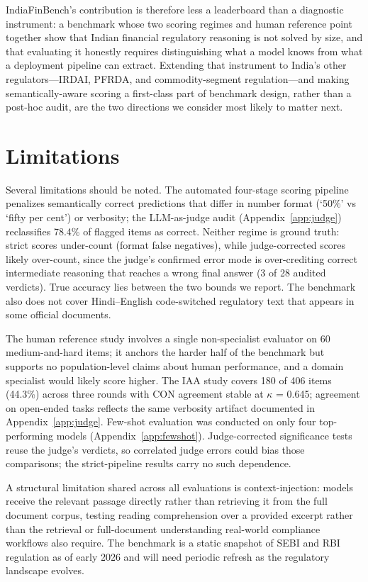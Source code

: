 \documentclass[11pt]{article}
\begin{document}
IndiaFinBench's contribution is therefore less a leaderboard than a diagnostic instrument: a benchmark whose two scoring regimes and human reference point together show that Indian financial regulatory reasoning is not solved by size, and that evaluating it honestly requires distinguishing what a model knows from what a deployment pipeline can extract. Extending that instrument to India's other regulators---IRDAI, PFRDA, and commodity-segment regulation---and making semantically-aware scoring a first-class part of benchmark design, rather than a post-hoc audit, are the two directions we consider most likely to matter next.

\section*{Limitations}

Several limitations should be noted. The automated four-stage scoring pipeline penalizes semantically correct predictions that differ in number format (`50\%' vs `fifty per cent') or verbosity; the LLM-as-judge audit (Appendix~\ref{app:judge}) reclassifies 78.4\% of flagged items as correct. Neither regime is ground truth: strict scores under-count (format false negatives), while judge-corrected scores likely over-count, since the judge's confirmed error mode is over-crediting correct intermediate reasoning that reaches a wrong final answer (3 of 28 audited verdicts). True accuracy lies between the two bounds we report. The benchmark also does not cover Hindi--English code-switched regulatory text that appears in some official documents.

The human reference study involves a single non-specialist evaluator on 60 medium-and-hard items; it anchors the harder half of the benchmark but supports no population-level claims about human performance, and a domain specialist would likely score higher. The IAA study covers 180 of 406 items (44.3\%) across three rounds with CON agreement stable at $\kappa$ = 0.645; agreement on open-ended tasks reflects the same verbosity artifact documented in Appendix~\ref{app:judge}. Few-shot evaluation was conducted on only four top-performing models (Appendix~\ref{app:fewshot}). Judge-corrected significance tests reuse the judge's verdicts, so correlated judge errors could bias those comparisons; the strict-pipeline results carry no such dependence.

A structural limitation shared across all evaluations is context-injection: models receive the relevant passage directly rather than retrieving it from the full document corpus, testing reading comprehension over a provided excerpt rather than the retrieval or full-document understanding real-world compliance workflows also require. The benchmark is a static snapshot of SEBI and RBI regulation as of early 2026 and will need periodic refresh as the regulatory landscape evolves.
\end{document}
